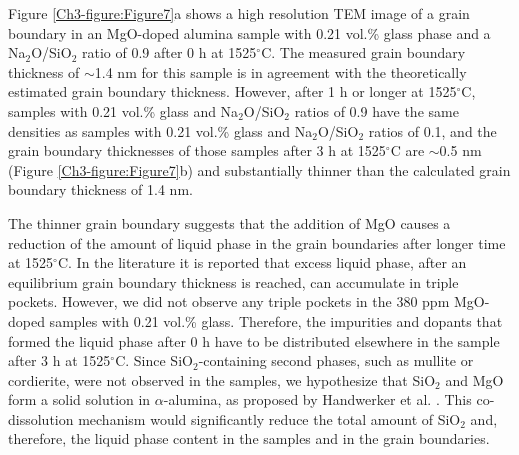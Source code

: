 Figure \ref{Ch3-figure:Figure7}a shows a high resolution TEM image of a grain boundary in an MgO-doped alumina sample with 0.21 vol.\% glass phase and a Na$_{2}$O/SiO$_{2}$ ratio of 0.9 after 0 h at 1525$^{\circ}$C. The measured grain boundary thickness of $\sim$1.4 nm for this sample is in agreement with the theoretically estimated \cite{Frueh2016a} grain boundary thickness. However, after 1 h or longer at 1525$^{\circ}$C, samples with 0.21 vol.\% glass and Na$_{2}$O/SiO$_{2}$ ratios of 0.9 have the same densities as samples with 0.21 vol.\% glass and Na$_{2}$O/SiO$_{2}$ ratios of 0.1, and the grain boundary thicknesses of those samples after 3 h at 1525$^{\circ}$C are $\sim$0.5 nm (Figure \ref{Ch3-figure:Figure7}b) and substantially thinner than the calculated grain boundary thickness of 1.4 nm.

The thinner grain boundary suggests that the addition of MgO causes a reduction of the amount of liquid phase in the grain boundaries after longer time at 1525$^{\circ}$C. In the literature it is reported that excess liquid phase, after an equilibrium grain boundary thickness \cite{Subramaniam2006} is reached, can accumulate in triple pockets. However, we did not observe any triple pockets in the 380 ppm MgO-doped samples with 0.21 vol.\% glass. Therefore, the impurities and dopants that formed the liquid phase after 0 h have to be distributed elsewhere in the sample after 3 h at 1525$^{\circ}$C. Since SiO$_{2}$-containing second phases, such as mullite or cordierite, were not observed in the samples, we hypothesize that SiO$_{2}$ and MgO form a solid solution in $\alpha$-alumina, as proposed by Handwerker et al. \cite{Handwerker1989}. This co-dissolution mechanism would significantly reduce the total amount of SiO$_{2}$ and, therefore, the liquid phase content in the samples and in the grain boundaries. 


